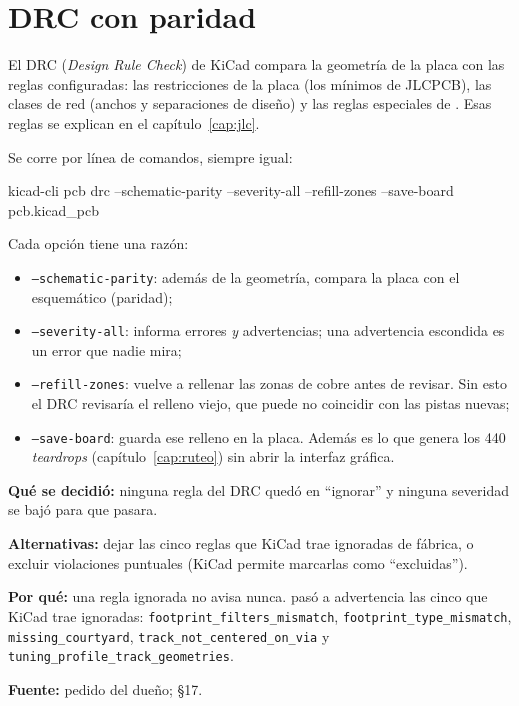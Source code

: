 \section{DRC con paridad}\label{sec:c11-drc}

El DRC (\emph{Design Rule Check}) de KiCad compara la geometría de la placa con las reglas configuradas: las
restricciones de la placa (los mínimos de JLCPCB), las clases de red (anchos y separaciones de diseño) y las reglas
especiales de . Esas reglas se explican en el capítulo~\ref{cap:jlc}.

Se corre por línea de comandos, siempre igual:
\begin{center}
\small\ttfamily kicad-cli pcb drc --schematic-parity --severity-all --refill-zones --save-board pcb.kicad\_pcb
\end{center}
Cada opción tiene una razón:
\begin{itemize}
  \item \texttt{--schematic-parity}: además de la geometría, compara la placa con el esquemático (paridad);
  \item \texttt{--severity-all}: informa errores \emph{y} advertencias; una advertencia escondida es un error que
  nadie mira;
  \item \texttt{--refill-zones}: vuelve a rellenar las zonas de cobre antes de revisar. Sin esto el DRC revisaría el
  relleno viejo, que puede no coincidir con las pistas nuevas;
  \item \texttt{--save-board}: guarda ese relleno en la placa. Además es lo que genera los 440 \emph{teardrops}
  (capítulo~\ref{cap:ruteo}) sin abrir la interfaz gráfica.
\end{itemize}

\begin{decision}
\textbf{Qué se decidió:} ninguna regla del DRC quedó en ``ignorar'' y ninguna severidad se bajó para que pasara.\par
\textbf{Alternativas:} dejar las cinco reglas que KiCad trae ignoradas de fábrica, o excluir violaciones puntuales
(KiCad permite marcarlas como ``excluidas'').\par
\textbf{Por qué:} una regla ignorada no avisa nunca.  pasó a advertencia las cinco
que KiCad trae ignoradas: \texttt{footprint\_filters\_mismatch}, \texttt{footprint\_type\_mismatch},
\texttt{missing\_courtyard}, \texttt{track\_not\_centered\_on\_via} y
\texttt{tuning\_profile\_track\_geometries}.\par
\textbf{Fuente:} pedido del dueño;  §17.
\end{decision}

